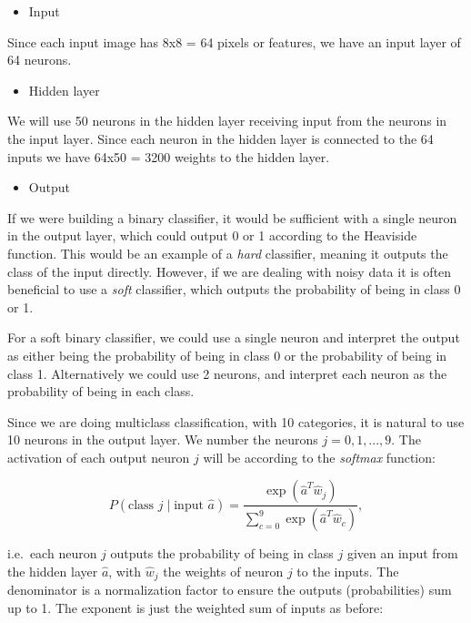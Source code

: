\documentclass[%
oneside,                 %
final,                   %
10pt]{article}
\begin{document}
\begin{itemize}
\item Input 
\end{itemize}

\noindent
Since each input image has 8x8 = 64 pixels or features, we have an input layer of 64 neurons.  

\begin{itemize}
\item Hidden layer
\end{itemize}

\noindent
We will use 50 neurons in the hidden layer receiving input from the neurons in the input layer.  
Since each neuron in the hidden layer is connected to the 64 inputs we have 64x50 = 3200 weights to the hidden layer.  

\begin{itemize}
\item Output
\end{itemize}

\noindent
If we were building a binary classifier, it would be sufficient with a single neuron in the output layer,
which could output 0 or 1 according to the Heaviside function. This would be an example of a \emph{hard} classifier, meaning it outputs the class of the input directly. However, if we are dealing with noisy data it is often beneficial to use a \emph{soft} classifier, which outputs the probability of being in class 0 or 1.  

For a soft binary classifier, we could use a single neuron and interpret the output as either being the probability of being in class 0 or the probability of being in class 1. Alternatively we could use 2 neurons, and interpret each neuron as the probability of being in each class.  

Since we are doing multiclass classification, with 10 categories, it is natural to use 10 neurons in the output layer. We number the neurons $j = 0,1,...,9$. The activation of each output neuron $j$ will be according to the \emph{softmax} function:  

$$ P(\text{class $j$} \mid \text{input $\hat{a}$}) = \frac{\exp{(\hat{a}^T \hat{w}_j)}}
{\sum_{c=0}^{9} \exp{(\hat{a}^T \hat{w}_c)}} ,$$  

i.e.~each neuron $j$ outputs the probability of being in class $j$ given an input from the hidden layer $\hat{a}$, with $\hat{w}_j$ the weights of neuron $j$ to the inputs.  
The denominator is a normalization factor to ensure the outputs (probabilities) sum up to 1.  
The exponent is just the weighted sum of inputs as before:  
\end{document}
